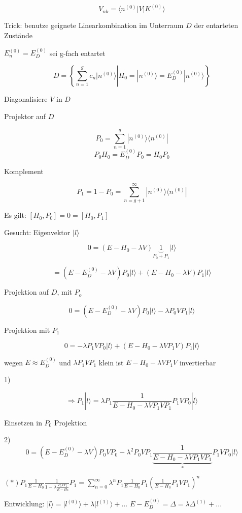 \[ V_{nk} = \langle n^{(0)} | V | K^{(0)} \rangle \]

Trick: benutze geignete Linearkombination im Unterraum \(D\) der entarteten Zustände

\( E^{(0)}_n = E^{(0)}_D\) sei g-fach entartet

\[ D =  \left\{ \left. \sum^g_{n=1} c_n |n^{(0)}\rangle \right| H_0  =
  |n^{(0)}\rangle = E^{(0)}_D|n^{(0)}\rangle \right\}\]

Diagonalisiere \(V\) in \(D\)

Projektor auf \(D\)

\[ P_0 = \sum^g_{n=1} |n^{(0)}\rangle\langle n^{(0)}|\]
\[ P_0H_0 = E^{(0)}_D P_0 = H_0 P_0\]

Komplement

\[ P_1 = 1-P_0 = \sum^\infty_{n=g+1} |n^{(0)}\rangle\langle n^{(0)}|\]

Es gilt: \([H_0,P_0]=0=[H_0,P_1]\)

Gesucht: Eigenvektor \(|l\rangle\)

\[ 0 = (E-H_0-\lambda V)\underbrace{1}_{P_0+P_1} |l\rangle \]

\[ = (E-E^{(0)}_D-\lambda V)P_0 |l\rangle + (E-H_0-\lambda V)P_1
|l\rangle \]

Projektion auf \(D\), mit \(P_o\)

\[ 0=(E-E^{(0)}_D-\lambda V)P_0 |l\rangle -  \lambda P_0 V P_1 |l\rangle \]

Projektion mit \(P_1\)

\[ 0= -  \lambda P_1 V P_0 |l\rangle +  (E-H_0-\lambda V P_1 V)P_1
|l\rangle\]

wegen \(E\approx E^{(0)}_D\) und \(\lambda P_1VP_1\) klein ist \(E-H_0-\lambda V P_1 V\) invertierbar

1)

\[\Rightarrow P_1|l\rangle = \lambda P_1 \frac 1 {E-H_0-\lambda V P_1
  V P_1} P_1 V P_0 |l\rangle\]

Einsetzen in \(P_0\) Projektion

2)
\[ 0=(E-E^{(0)}_D-\lambda V)P_0 V P_0 - \lambda^2 P_0 VP_1
\underbrace{\frac {1} {E-H_0-\lambda V P_1 V P_1}}_{*} P_1 V P_0 |l\rangle\]

\((*) P_1\frac 1{E-H_0}\frac 1 {1-\lambda\frac{P_1VP_1}{E-H_0}}P_1= \sum^\infty_{n=0}\lambda^n P_1\frac 1 {E-H_0} P_1(\frac 1 {E-H_0} P_1VP_1)^n \)

 

Entwicklung: \(|l\rangle =|l^{(0)}\rangle +\lambda|l^{(1)}\rangle +...\) \(E-E^{(0)}_D = \Delta = \lambda\Delta^{(1)}+...\)

